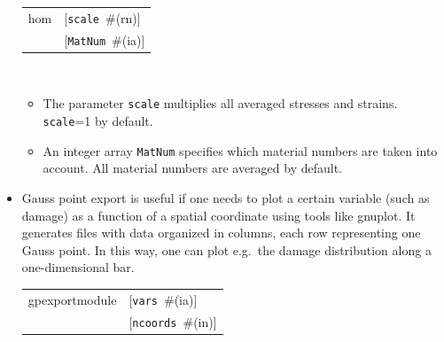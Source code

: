 \documentclass[a4paper]{article}
\makeatletter
\newcommand{\param}[1]{\texttt{#1}} %
\newcommand{\optional}[1]{[#1]} %
\newcommand{\field}[2]{\param{#1}~\#{\tiny(#2)}} %
\newcommand{\optField}[2]{\optional{\field{#1}{#2}}}
\newenvironment{record}[1][]{\begin{tabular}{|ll}}{\end{tabular}\\}
\newcommand{\recentry}[2]{{#1}&{#2}\\}
\newcounter{rcc}
\newenvironment{record}[1][\textwidth]{\setcounter{rcc}{0}\begin{tabular*}{#1}{|ll@{\extracolsep{\fill}}r}}{\end{tabular*}\\}
\newcommand{\recentry}[2]{\ifthenelse{\value{rcc}>0}{&$\backslash$ \\}{\setcounter{rcc}{1}}{#1}&{#2}}
\makeatother
\begin{document}
\begin{itemize}
\begin{record}[0.9\textwidth]
  \recentry{hom}{\optField{scale}{rn}}
  \recentry{}{\optField{MatNum}{ia}}
\end{record}
\begin{itemize}

\item The parameter \param{scale} multiplies all averaged stresses and strains. \param{scale}=1 by default.

\item An integer array \param{MatNum} specifies which material numbers are taken into account. All material numbers are averaged by default.
\end{itemize}

\item Gauss point export is useful if one needs to plot a certain variable
(such as damage) as a function of a spatial coordinate using tools like
gnuplot. It generates files with data organized in columns, each row
representing one Gauss point. In this way, one can plot e.g.\ the damage
distribution along a one-dimensional bar.

\begin{record}[0.9\textwidth]
  \recentry{gpexportmodule}{\optField{vars}{ia}}
  \recentry{}{\optField{ncoords}{in}}
\end{record}


\end{itemize}
\end{document}
